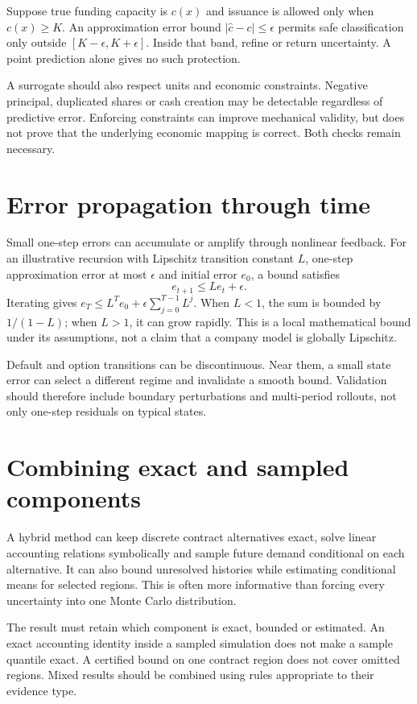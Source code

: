Suppose true funding capacity is $c(x)$ and issuance is allowed only when $c(x)\geq K$. An approximation error bound $|\hat c-c|\leq\epsilon$ permits safe classification only outside $[K-\epsilon,K+\epsilon]$. Inside that band, refine or return uncertainty. A point prediction alone gives no such protection.

A surrogate should also respect units and economic constraints. Negative principal, duplicated shares or cash creation may be detectable regardless of predictive error. Enforcing constraints can improve mechanical validity, but does not prove that the underlying economic mapping is correct. Both checks remain necessary.



\section{Error propagation through time}
Small one-step errors can accumulate or amplify through nonlinear feedback. For an illustrative recursion with Lipschitz transition constant $L$, one-step approximation error at most $\epsilon$ and initial error $e_0$, a bound satisfies
\begin{equation}
 e_{t+1}\leq Le_t+\epsilon.
\end{equation}
Iterating gives $e_T\leq L^Te_0+\epsilon\sum_{j=0}^{T-1}L^j$. When $L<1$, the sum is bounded by $1/(1-L)$; when $L>1$, it can grow rapidly. This is a local mathematical bound under its assumptions, not a claim that a company model is globally Lipschitz.

Default and option transitions can be discontinuous. Near them, a small state error can select a different regime and invalidate a smooth bound. Validation should therefore include boundary perturbations and multi-period rollouts, not only one-step residuals on typical states.

\section{Combining exact and sampled components}
A hybrid method can keep discrete contract alternatives exact, solve linear accounting relations symbolically and sample future demand conditional on each alternative. It can also bound unresolved histories while estimating conditional means for selected regions. This is often more informative than forcing every uncertainty into one Monte Carlo distribution.

The result must retain which component is exact, bounded or estimated. An exact accounting identity inside a sampled simulation does not make a sample quantile exact. A certified bound on one contract region does not cover omitted regions. Mixed results should be combined using rules appropriate to their evidence type.

